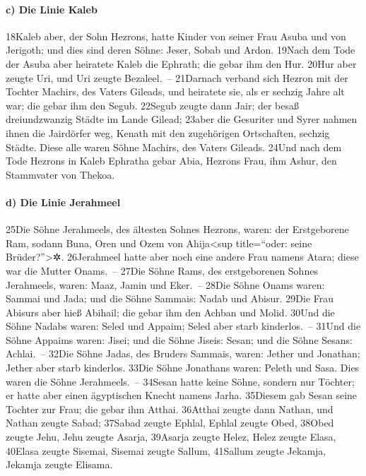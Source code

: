 \hypertarget{c-die-linie-kaleb}{%
\paragraph{c) Die Linie Kaleb}\label{c-die-linie-kaleb}}

18Kaleb aber, der Sohn Hezrons, hatte Kinder von seiner Frau Asuba und
von Jerigoth; und dies sind deren Söhne: Jeser, Sobab und Ardon. 19Nach
dem Tode der Asuba aber heiratete Kaleb die Ephrath; die gebar ihm den
Hur. 20Hur aber zeugte Uri, und Uri zeugte Bezaleel.~-- 21Darnach
verband sich Hezron mit der Tochter Machirs, des Vaters Gileads, und
heiratete sie, als er sechzig Jahre alt war; die gebar ihm den Segub.
22Segub zeugte dann Jair; der besaß dreiundzwanzig Städte im Lande
Gilead; 23aber die Gesuriter und Syrer nahmen ihnen die Jairdörfer weg,
Kenath mit den zugehörigen Ortschaften, sechzig Städte. Diese alle waren
Söhne Machirs, des Vaters Gileads. 24Und nach dem Tode Hezrons in Kaleb
Ephratha gebar Abia, Hezrons Frau, ihm Ashur, den Stammvater von Thekoa.

\hypertarget{d-die-linie-jerahmeel}{%
\paragraph{d) Die Linie Jerahmeel}\label{d-die-linie-jerahmeel}}

25Die Söhne Jerahmeels, des ältesten Sohnes Hezrons, waren: der
Erstgeborene Ram, sodann Buna, Oren und Ozem von Ahija\textless sup
title=``oder: seine Brüder?''\textgreater✲. 26Jerahmeel hatte aber noch
eine andere Frau namens Atara; diese war die Mutter Onams.~-- 27Die
Söhne Rams, des erstgeborenen Sohnes Jerahmeels, waren: Maaz, Jamin und
Eker.~-- 28Die Söhne Onams waren: Sammai und Jada; und die Söhne
Sammais: Nadab und Abisur. 29Die Frau Abisurs aber hieß Abihail; die
gebar ihm den Achban und Molid. 30Und die Söhne Nadabs waren: Seled und
Appaim; Seled aber starb kinderlos.~-- 31Und die Söhne Appaims waren:
Jisei; und die Söhne Jiseis: Sesan; und die Söhne Sesans: Achlai.~--
32Die Söhne Jadas, des Bruders Sammais, waren: Jether und Jonathan;
Jether aber starb kinderlos. 33Die Söhne Jonathans waren: Peleth und
Sasa. Dies waren die Söhne Jerahmeels.~-- 34Sesan hatte keine Söhne,
sondern nur Töchter; er hatte aber einen ägyptischen Knecht namens
Jarha. 35Diesem gab Sesan seine Tochter zur Frau; die gebar ihm Atthai.
36Atthai zeugte dann Nathan, und Nathan zeugte Sabad; 37Sabad zeugte
Ephlal, Ephlal zeugte Obed, 38Obed zeugte Jehu, Jehu zeugte Asarja,
39Asarja zeugte Helez, Helez zeugte Elasa, 40Elasa zeugte Sisemai,
Sisemai zeugte Sallum, 41Sallum zeugte Jekamja, Jekamja zeugte Elisama.

